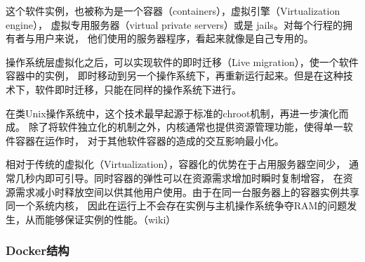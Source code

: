 \documentclass[AutoFakeBold,a4paper]{ctexart}
\begin{document}
这个软件实例，也被称为是一个容器（containers），虚拟引擎（Virtualization engine），
虚拟专用服务器（virtual private servers）或是 jails。对每个行程的拥有者与用户来说，
他们使用的服务器程序，看起来就像是自己专用的。

操作系统层虚拟化之后，可以实现软件的即时迁移（Live migration），使一个软件容器中的实例，
即时移动到另一个操作系统下，再重新运行起来。但是在这种技术下，软件即时迁移，只能在同样的操作系统下进行。

在类Unix操作系统中，这个技术最早起源于标准的chroot机制，再进一步演化而成。
除了将软件独立化的机制之外，内核通常也提供资源管理功能，使得单一软件容器在运作时，
对于其他软件容器的造成的交互影响最小化。

相对于传统的虚拟化（Virtualization），容器化的优势在于占用服务器空间少，
通常几秒内即可引导。同时容器的弹性可以在资源需求增加时瞬时复制增容，
在资源需求减小时释放空间以供其他用户使用。由于在同一台服务器上的容器实例共享同一个系统内核，
因此在运行上不会存在实例与主机操作系统争夺RAM的问题发生，从而能够保证实例的性能。（wiki）

\subsubsection{Docker结构}
\end{document}
